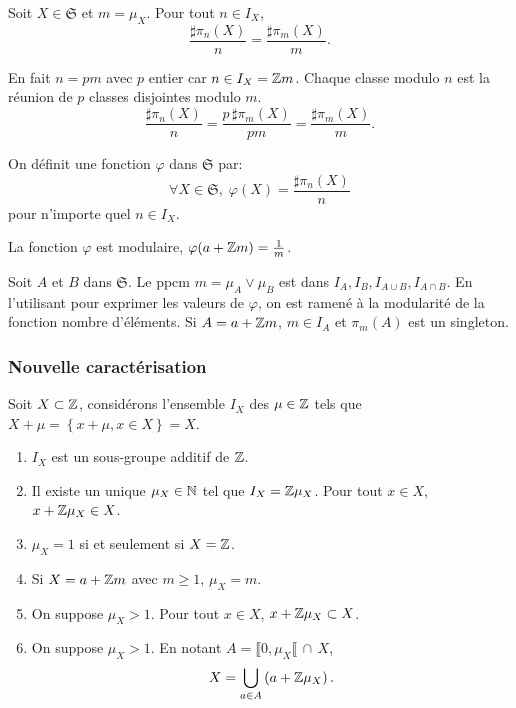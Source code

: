 \begin{lem}
  Soit $X\in \mathfrak{S}$ et $m=\mu_X$. Pour tout $n\in I_X$,
  \begin{displaymath}
      \frac{\sharp \pi_n(X)}{n} = \frac{\sharp \pi_m(X)}{m}.
  \end{displaymath}
\end{lem}
\begin{demo}
  En fait $n = pm$ avec $p$ entier car $n \in I_X = \mathbb{Z} m$. Chaque classe modulo $n$ est la réunion de $p$ classes disjointes modulo $m$.
  \begin{displaymath}
    \frac{\sharp \pi_n(X)}{n} = \frac{p \, \sharp \pi_m(X)}{ p m} = \frac{\sharp \pi_m(X)}{m}.
  \end{displaymath}
\end{demo}
\begin{defi}\label{defPhi}
  On définit une fonction $\varphi$ dans $\mathfrak{S}$ par:
  \begin{displaymath}
    \forall X \in \mathfrak{S}, \; \varphi(X) = \frac{\sharp \pi_n(X)}{n}
  \end{displaymath}
pour n'importe quel $n\in I_X$.
\end{defi}
\begin{prop}
  La fonction $\varphi$ est modulaire, $\varphi(a + \mathbb{Z} m) = \frac{1}{m}$.
\end{prop}
\begin{demo}
  Soit $A$ et $B$ dans $\mathfrak{S}$. Le ppcm $m = \mu_A \vee \mu_B$ est dans $I_A, I_B, I_{A\cup B}, I_{A\cap B}$. En l'utilisant pour exprimer les valeurs de $\varphi$, on est ramené à la modularité de la fonction nombre d'éléments.\newline
  Si $A= a + \mathbb{Z} m$, $m \in I_A$ et $\pi_m(A)$ est un singleton.
\end{demo}

\subsubsection{Nouvelle caractérisation}
Soit $X \subset \mathbb{Z}$, considérons l'ensemble $I_X$ des $\mu \in \mathbb{Z}$ tels que $X + \mu =\left\lbrace x + \mu , x\in X\right\rbrace = X$.
\begin{rems}
  \begin{enumerate}
    \item $I_X$ est un sous-groupe additif de $\mathbb{Z}$.
    \item Il existe un unique $\mu_X \in \mathbb{N}$ tel que $I_X = \mathbb{Z} \mu_X$. Pour tout $x\in X$, $x + \mathbb{Z} \mu_X \in X$.
    \item $\mu_X = 1$ si et seulement si $X=\mathbb{Z}$.
    \item Si $X = a + \mathbb{Z} m$ avec $m \geq 1$, $\mu_X = m$.
    \item On suppose $\mu_X > 1$. Pour tout $x \in X$, $x + \mathbb{Z} \mu_X \subset X$.
    \item On suppose $\mu_X > 1$. En notant $A  = \llbracket 0 , \mu_X \llbracket \, \cap \, X$,
\begin{displaymath}
  X = \bigcup_{a \in A}\left(a + \mathbb{Z} \mu_X\right).
\end{displaymath}
  \end{enumerate}
\end{rems}

